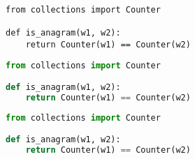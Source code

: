 \begin{lstlisting}
from collections import Counter

def is_anagram(w1, w2):
    return Counter(w1) == Counter(w2)
\end{lstlisting}

\begin{lstlisting}[language=python]
from collections import Counter

def is_anagram(w1, w2):
    return Counter(w1) == Counter(w2)
\end{lstlisting}

\begin{lstlisting}[language=python, caption=Función para determinar cuando una palabra \textt{w1} es anagrama de otra palabra \textt{w2}]
from collections import Counter

def is_anagram(w1, w2):
    return Counter(w1) == Counter(w2)
\end{lstlisting}
